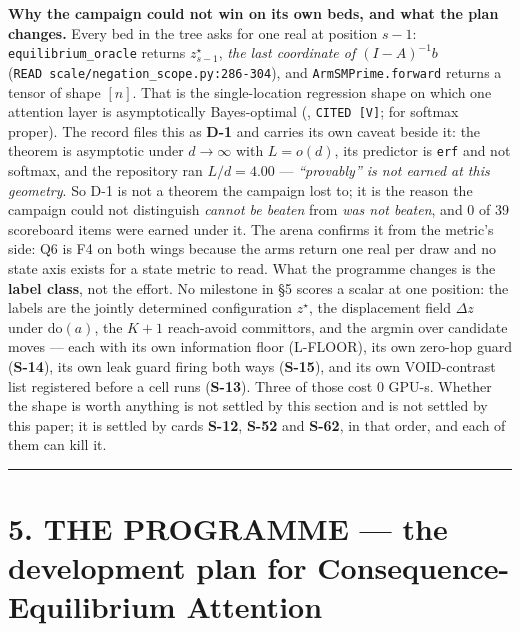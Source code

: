 \documentclass[11pt,a4paper]{article}
\theoremstyle{plain}
\theoremstyle{definition}
\theoremstyle{remark}
\begin{document}
\textbf{Why the campaign could not win on its own beds, and what the
plan changes.} Every bed in the tree asks for one real at position
\(s-1\): \texttt{equilibrium\_oracle} returns \(z^\star_{s-1}\),
\emph{the last coordinate of \((I-A)^{-1}b\)}
(\texttt{READ\ scale/negation\_scope.py:286-304}), and
\texttt{ArmSMPrime.forward} returns a tensor of shape \([n]\). That is
the single-location regression shape on which one attention layer is
asymptotically Bayes-optimal (\citep{marion-2025-single-location},
\texttt{CITED\ {[}V{]}}; \citep{duranthon-2026-softmax-advantage} for
softmax proper). The record files this as \textbf{D-1} and carries its
own caveat beside it: the theorem is asymptotic under \(d\to\infty\)
with \(L=o(d)\), its predictor is \texttt{erf} and not softmax, and the
repository ran \(L/d=4.00\) --- \emph{``provably'' is not earned at this
geometry}. So D-1 is not a theorem the campaign lost to; it is the
reason the campaign could not distinguish \emph{cannot be beaten} from
\emph{was not beaten}, and 0 of 39 scoreboard items were earned under
it. The arena confirms it from the metric's side: Q6 is F4 on both wings
because the arms return one real per draw and no state axis exists for a
state metric to read. What the programme changes is the \textbf{label
class}, not the effort. No milestone in §5 scores a scalar at one
position: the labels are the jointly determined configuration
\(z^\star\), the displacement field \(\Delta z\) under
\(\mathrm{do}(a)\), the \(K+1\) reach-avoid committors, and the argmin
over candidate moves --- each with its own information floor (L-FLOOR),
its own zero-hop guard (\textbf{S-14}), its own leak guard firing both
ways (\textbf{S-15}), and its own VOID-contrast list registered before a
cell runs (\textbf{S-13}). Three of those cost \(0\) GPU-s. Whether the
shape is worth anything is not settled by this section and is not
settled by this paper; it is settled by cards \textbf{S-12},
\textbf{S-52} and \textbf{S-62}, in that order, and each of them can
kill it.

\begin{center}\rule{0.5\linewidth}{0.5pt}\end{center}

\section{5. THE PROGRAMME --- the development plan for
Consequence-Equilibrium
Attention}\label{the-programme-the-development-plan-for-consequence-equilibrium-attention}
\end{document}
